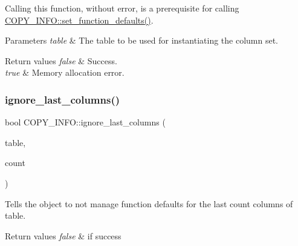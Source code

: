 Calling this function, without error, is a prerequisite for calling \mbox{\hyperlink{classCOPY__INFO_a7ce8622f7a089c3b7ad02858539899ba}{C\+O\+P\+Y\+\_\+\+I\+N\+F\+O\+::set\+\_\+function\+\_\+defaults()}}.


\begin{DoxyParams}{Parameters}
{\em table} & The table to be used for instantiating the column set.\\
\hline
\end{DoxyParams}

\begin{DoxyRetVals}{Return values}
{\em false} & Success. \\
\hline
{\em true} & Memory allocation error. \\
\hline
\end{DoxyRetVals}
\mbox{\label{classCOPY__INFO_a76b958b97160409b58f5ca669014e732}} 
\subsubsection{\texorpdfstring{ignore\+\_\+last\+\_\+columns()}{ignore\_last\_columns()}}
{\footnotesize\ttfamily bool C\+O\+P\+Y\+\_\+\+I\+N\+F\+O\+::ignore\+\_\+last\+\_\+columns (\begin{DoxyParamCaption}\item[{\mbox{\hyperlink{structTABLE}{T\+A\+B\+LE}} $\ast$}]{table,  }\item[{uint}]{count }\end{DoxyParamCaption})}

Tells the object to not manage function defaults for the last \textquotesingle{}count\textquotesingle{} columns of \textquotesingle{}table\textquotesingle{}. 
\begin{DoxyRetVals}{Return values}
{\em false} & if success \\
\hline
\end{DoxyRetVals}
\mbox{\label{classCOPY__INFO_a7ce8622f7a089c3b7ad02858539899ba}} 
